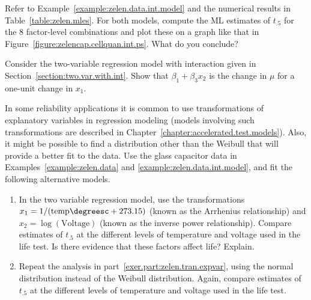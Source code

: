 \begin{exercise}
Refer to Example~\ref{example:zelen.data.int.model} and the numerical
results in Table~\ref{table:zelen.mles}. For both models,
compute the ML estimates of
$t_{.5}$ for the 8 factor-level combinations and plot these on a graph
like that in Figure~\ref{figure:zelencap.cellquan.int.ps}.  What do
you conclude?
\end{exercise}

\begin{exercise}
Consider the two-variable regression model
with interaction given in Section~\ref{section:two.var.with.int}.
Show that $\beta_{1} + \beta_{3}x_{2}$ is the change in $\mu$ for
a one-unit change in $x_{1}$.
\end{exercise}

\begin{exercise}
In some reliability applications it is common to use transformations
of explanatory variables in regression modeling (models involving such
transformations are described in
Chapter~\ref{chapter:accelerated.test.models}). Also, it might be
possible to find a distribution other than the Weibull that will
provide a better fit to the data.  Use the glass capacitor data
in Examples~\ref{example:zelen.data} and
\ref{example:zelen.data.int.model}, and fit the following
alternative models.
\begin{enumerate}
\item
\label{exer.part:zelen.tran.expvar}
In the two variable regression model, use the transformations
$x_{1}=1/(\mbox{temp}\degreesc+ 273.15)$ (known as the Arrhenius
relationship) and $x_{2}=\log(\mbox{Voltage})$ (known as the inverse
power relationship). 
Compare estimates of $t_{.5}$ at the different levels of
temperature and voltage used in the life test. Is there evidence
that these factors affect life? Explain.
\item
Repeat the analysis in part~\ref{exer.part:zelen.tran.expvar},
using the normal distribution instead of the Weibull distribution.
Again, compare estimates of $t_{.5}$ at the different levels of
temperature and voltage used in the life test.
\end{enumerate}
\end{exercise}

